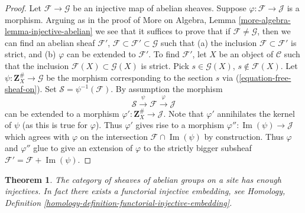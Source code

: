 \documentclass{stacks-project}
\theoremstyle{plain}
\newtheorem{theorem}[subsection]{Theorem}
\theoremstyle{definition}
\theoremstyle{remark}
\numberwithin{equation}{subsection}
\def\Im{\mathop{\mathrm{Im}}}
\begin{document}
\begin{proof}
Let $\mathcal{F} \to \mathcal{G}$ be an injective map
of abelian sheaves. Suppose $\varphi : \mathcal{F} \to \mathcal{J}$
is a morphism. Arguing as in the proof of
More on Algebra, Lemma \ref{more-algebra-lemma-injective-abelian}
we see that it suffices
to prove that if $\mathcal{F} \not = \mathcal{G}$, then we
can find an abelian sheaf $\mathcal{F}'$,
$\mathcal{F} \subset \mathcal{F}' \subset \mathcal{G}$
such that (a) the inclusion $\mathcal{F} \subset \mathcal{F}'$ is strict,
and (b) $\varphi$ can be extended to $\mathcal{F}'$.
To find $\mathcal{F}'$, let $X$ be an object of $\mathcal{C}$ such
that the inclusion $\mathcal{F}(X) \subset \mathcal{G}(X)$
is strict. Pick $s \in \mathcal{G}(X)$, $s \not \in \mathcal{F}(X)$.
Let $\psi : \mathbf{Z}_X^\# \to \mathcal{G}$ be the morphism corresponding
to the section $s$ via (\ref{equation-free-sheaf-on}). Set
$\mathcal{S} = \psi^{-1}(\mathcal{F})$. By assumption the morphism
$$
\mathcal{S} \xrightarrow{\psi} \mathcal{F} \xrightarrow{\varphi} \mathcal{J}
$$
can be extended to a morphism $\varphi' : \mathbf{Z}_X^\# \to \mathcal{J}$.
Note that $\varphi'$ annihilates the kernel of $\psi$ (as this is true
for $\varphi$). Thus $\varphi'$ gives rise to a morphism
$\varphi'' : \Im(\psi) \to \mathcal{J}$
which agrees with $\varphi$ on the intersection
$\mathcal{F} \cap \Im(\psi)$ by construction.
Thus $\varphi$ and $\varphi''$ glue to give an extension
of $\varphi$ to the strictly bigger subsheaf
$\mathcal{F}' = \mathcal{F} + \Im(\psi)$.
\end{proof}

\begin{theorem}
\label{theorem-sheaves-injectives}
The category of sheaves of abelian groups on a
site has enough injectives. In fact there exists
a functorial injective embedding, see
Homology, Definition \ref{homology-definition-functorial-injective-embedding}.
\end{theorem}
\end{document}
